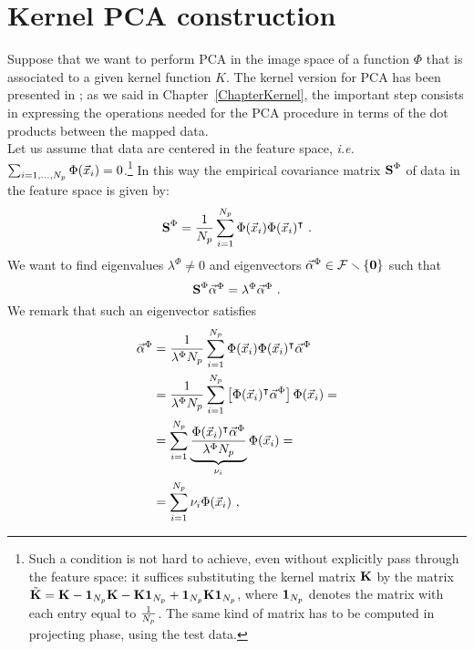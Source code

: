 \chapter{Kernel PCA construction}\label{app:KPCA}

Suppose that we want to perform PCA in the image space of a function $\Phi$ that is associated to a given kernel function $K$. The kernel version for PCA has been presented in \cite{scholkopf1998nonlinear}; as we said in Chapter~\ref{ChapterKernel}, the important step consists in expressing the operations needed for the PCA procedure in terms of the dot products between the mapped data.\\

Let us assume that data are centered in the feature space, {\em i.e.} $\sum_{i=1,\dots,N_p}\Phi(\vec{x}_{i})=0$.\footnote{Such a condition is not hard to achieve, even without explicitly pass through the feature space: it suffices substituting the kernel matrix $\textbf{K}$ by the matrix $\tilde{\textbf{K}} = \textbf{K} - \boldsymbol{1}_{N_p}\textbf{K} - \textbf{K}\boldsymbol{1}_{N_p} + \boldsymbol{1}_{N_p}\textbf{K}\boldsymbol{1}_{N_p}$, where $\boldsymbol{1}_{N_p}$ denotes the matrix with each entry equal to $\frac{1}{N_p}$. The same kind of matrix has to be computed in projecting phase, using the test data.} In this way the empirical covariance matrix $\textbf{S}^\Phi$ of data in the feature space is given by:
\begin{equation}
\textbf{S}^\Phi = \frac{1}{N_p} \sum_{i=1}^{N_p}\Phi(\vec{x}_{i})\Phi(\vec{x}_{i})^\intercal \mbox{ .}
\end{equation} 
We want to find eigenvalues $\lambda^\Phi \neq 0$ and eigenvectors $\vec{\alpha}^\Phi\in \mathcal{F}\smallsetminus \{\boldsymbol{0}\}$ such that
\begin{equation}\label{eq:eigProblem}
\textbf{S}^\Phi\vec{\alpha}^\Phi = \lambda^\Phi \vec{\alpha}^\Phi \mbox{ .}
\end{equation}
We remark that such an eigenvector satisfies
\begin{align}
\vec{\alpha}^\Phi &= \frac{1}{\lambda^\Phi N_p}\sum_{i=1}^{N_p} \Phi(\vec{x}_{i})\Phi(\vec{x}_{i})^\intercal \vec{\alpha}^\Phi\\
\label{eq:passaggio}
&=  \frac{1}{\lambda^\Phi N_p}\sum_{i=1}^{N_p} \left[\Phi(\vec{x}_{i})^\intercal \vec{\alpha}^\Phi\right] \Phi(\vec{x}_{i}) =  \\
&= \sum_{i=1}^{N_p}\underbrace{\frac{\Phi(\vec{x}_{i})^\intercal \vec{\alpha}^\Phi}{\lambda^\Phi N_p}}_{\nu_i}\Phi(\vec{x}_{i}) = \\
\label{eq:linearComb}
&= \sum_{i=1}^{N_p}\nu_i \Phi(\vec{x}_{i})\mbox{ ,}
\end{align}

